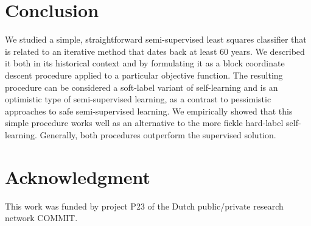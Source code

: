 \documentclass[conference,a4paper,10pt]{IEEEtran}\usepackage[]{graphicx}\usepackage[]{color}
\begin{document}
\section{Conclusion}
We studied a simple, straightforward semi-supervised least squares classifier that is related to an iterative method that dates back at least 60 years. We described it both in its historical context and by formulating it as a block coordinate descent procedure applied to a particular objective function. The resulting procedure can be considered a soft-label variant of self-learning and is an optimistic type of semi-supervised learning, as a contrast to pessimistic approaches to safe semi-supervised learning. We empirically showed that this simple procedure works well as an alternative to the more fickle hard-label self-learning. Generally, both procedures outperform the supervised solution.

\section*{Acknowledgment}
This work was funded by project P23 of the Dutch public/private research network COMMIT.


%

\end{document}

